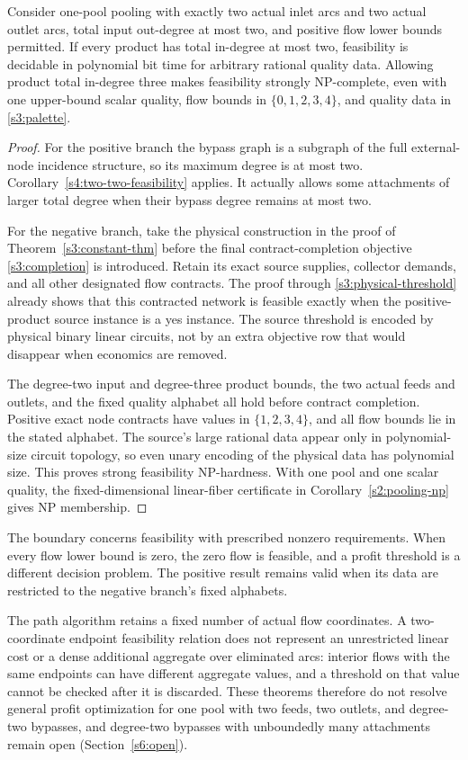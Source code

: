 \begin{corollary}
\label{s4:degree-boundary}
Consider one-pool pooling with exactly two actual inlet arcs and two
actual outlet arcs, total input out-degree at most two, and positive
flow lower bounds permitted. If every product has total in-degree at
most two, feasibility is decidable in polynomial bit time for arbitrary
rational quality data. Allowing product total in-degree three makes
feasibility strongly NP-complete, even with one upper-bound scalar
quality, flow bounds in $\{0,1,2,3,4\}$, and quality data in
\eqref{s3:palette}.
\end{corollary}
\begin{proof}
For the positive branch the bypass graph is a subgraph of the full
external-node incidence structure, so its maximum degree is at most
two. Corollary~\ref{s4:two-two-feasibility} applies. It actually allows
some attachments of larger total degree when their bypass degree
remains at most two.

For the negative branch, take the physical construction in the proof
of Theorem~\ref{s3:constant-thm} before the final contract-completion
objective \eqref{s3:completion} is introduced. Retain its exact source
supplies, collector demands, and all other designated flow contracts.
The proof through \eqref{s3:physical-threshold} already shows that this
contracted network is feasible exactly when the positive-product source
instance is a yes instance. The source threshold is encoded by physical
binary linear circuits, not by an extra objective row that would
disappear when economics are removed.

The degree-two input and degree-three product bounds, the two actual
feeds and outlets, and the fixed quality alphabet all hold before
contract completion. Positive exact node contracts have values in
$\{1,2,3,4\}$, and all flow bounds lie in the stated alphabet.
The source's large rational data appear only in polynomial-size
circuit topology, so even unary encoding of the physical data has
polynomial size. This proves strong feasibility NP-hardness. With
one pool and one scalar quality, the fixed-dimensional linear-fiber
certificate in Corollary~\ref{s2:pooling-np} gives NP membership.
\end{proof}

The boundary concerns feasibility with prescribed nonzero requirements.
When every flow lower bound is zero, the zero flow is feasible, and a
profit threshold is a different decision problem. The positive result
remains valid when its data are restricted to the negative branch's
fixed alphabets.

The path algorithm retains a fixed number of actual flow coordinates.
A two-coordinate endpoint feasibility relation does not represent an
unrestricted linear cost or a dense additional aggregate over
eliminated arcs: interior flows with the same endpoints can have
different aggregate values, and a threshold on that value cannot be
checked after it is discarded. These theorems therefore do not resolve
general profit optimization for one pool with two feeds, two outlets,
and degree-two bypasses, and degree-two bypasses with unboundedly many
attachments remain open (Section~\ref{s6:open}).

